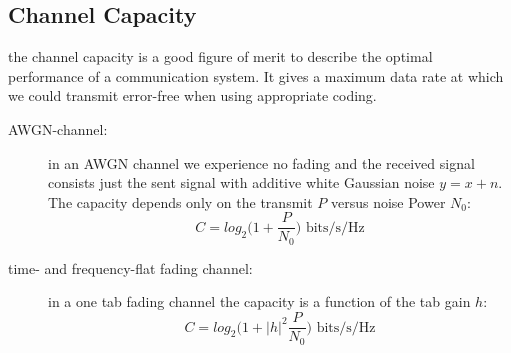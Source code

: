 \subsection{Channel Capacity}
the channel capacity is a good figure of merit to describe the optimal performance of a communication system. It gives a maximum data rate at which we could transmit error-free when using appropriate coding.
\begin{description}
	\item[AWGN-channel:] in an AWGN channel we experience no fading and the received signal consists just the sent signal with additive white Gaussian noise $y=x+n$. The capacity depends only on the transmit $P$ versus noise Power $N_0$:
	\begin{equation}
	C=log_2\Biggr(1+\frac{P}{N_0}\Biggl) \text{     bits/s/Hz}
	\end{equation}
	\item[time- and frequency-flat fading channel:] in a one tab fading channel the capacity is a function of the tab gain $h$:
	\begin{equation}C=log_2\Biggr(1+|h|^2\frac{P}{N_0}\Biggl) \text{     bits/s/Hz}
	\end{equation}
\end{description}
